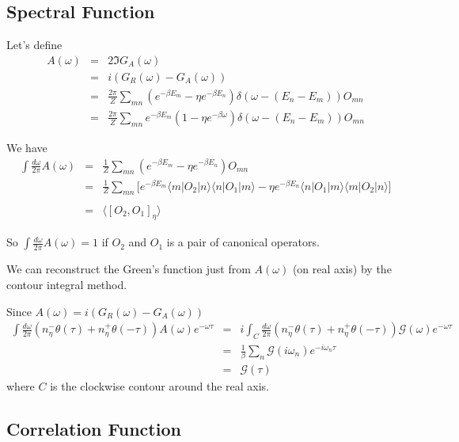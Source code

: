\documentclass[12pt]{book}
\begin{document}
	\subsection{Spectral Function}
	
	Let's define
	\begin{eqnarray}
		A(\omega)&=&2\Im G_A(\omega)\\
		&=&i(G_R(\omega)-G_A(\omega))\\
		&=&\frac {2\pi}Z\sum_{mn}(e^{-\beta E_m}-\eta e^{-\beta E_n})\delta(\omega-(E_n-E_m))O_{mn}\\
		&=&\frac{2\pi} Z\sum_{mn}e^{-\beta E_m}(1-\eta e^{-\beta\omega})\delta(\omega-(E_n-E_m))O_{mn}
	\end{eqnarray}
	
	We have
	\begin{eqnarray}
		\int \frac{d\omega}{2\pi} A(\omega)&=&\frac 1Z\sum_{mn}(e^{-\beta E_m}-\eta e^{-\beta E_n})O_{mn}\\
		&=&\frac 1Z\sum_{mn}\big[e^{-\beta E_m}\langle m|O_2|n\rangle\langle n|O_1|m\rangle-\eta e^{-\beta E_n}\langle n|O_1|m\rangle\langle m|O_2|n\rangle\big]\\\\
		&=&\langle [O_2,O_1]_\eta\rangle
	\end{eqnarray}
	
	So $\int \frac{d\omega}{2\pi} A(\omega)=1$ if $O_2$ and $O_1$ is a pair of canonical operators.
	
	We can reconstruct the Green's function just from $A(\omega)$ (on real axis) by the contour integral method.
	
	Since $A(\omega)=i(G_R(\omega)-G_A(\omega))$
	\begin{eqnarray}
		\int \frac{d\omega}{2\pi}(n_\eta^-\theta(\tau)+n_\eta^+\theta(-\tau)) A(\omega)e^{-\omega \tau}&=&i\int_C \frac{d\omega}{2\pi}(n_\eta^-\theta(\tau)+n_\eta^+\theta(-\tau)) \mathcal G(\omega)e^{-\omega \tau}\\
		&=&\frac 1\beta\sum_n\mathcal G(i\omega_n)e^{-i\omega_n \tau}\\
		&=&\mathcal G(\tau)
	\end{eqnarray}
	where $C$ is the clockwise contour around the real axis.
	
	\subsection{Correlation Function}
	
\end{document}
